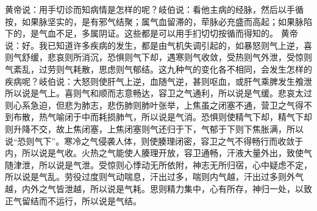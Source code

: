 \documentclass[a4paper,12pt,UTF8,twoside]{ctexbook}
\begin{document}
黄帝说：用手切诊而知病情是怎样的呢？岐伯说：看他主病的经脉，然后以手循按，如果脉坚实的，是有邪气结聚；属气血留滞的，荦脉必充盛而高起；如果脉陷下的，是气血不足，多属阴证。这些都是可以用手扪切切按循而得知的。
黄帝说：好。我已知道许多疾病的发生，都是由气机失调引起的，如暴怒则气上逆，喜则气舒缓，悲哀则所消沉，恐惧则气下却，遇寒则气收敛，受热则气外泄，受惊则气紊乱，过劳则气耗散，思虑则气郁结。这九种气的变化各不相同，会发生怎样的疾病呢？岐伯说：大怒则使肝气上逆，血随气逆，甚则呕血，或肝气乘脾发生飧泄所以说是气上。喜则气和顺而志意畅达，容卫之气通利，所以说是气缓。悲哀太过则心系急迫，但悲为肺志，悲伤肺则肺叶张举，上焦虽之闭塞不通，营卫之气得不到布散，热气喻闭于中而耗损肺气，所以说是气消。恐惧则使精气下却，精气下却则升降不交，故上焦闭塞，上焦闭塞则气还归于下，气郁于下则下焦胀满，所以说“恐则气下”。寒冷之气侵袭人体，则使腠理闭密，容卫之气不得畅行而收敛于内，所以说是气收。火热之气能使人腠理开放，容卫通畅，汗液大量外出，致使气随津泄，所以说是气泄。受惊则心悸动无所依附，神志无所归宿，心中疑虑不定，所以说是气乱。劳役过度则气动喘息，汗出过多，喘则内气越，汗出过多则外气越，内外之气皆泄越，所以说是气耗。思则精力集中，心有所存，神归一处，以致正气留结而不运行，所以说是气结。
\end{document}

